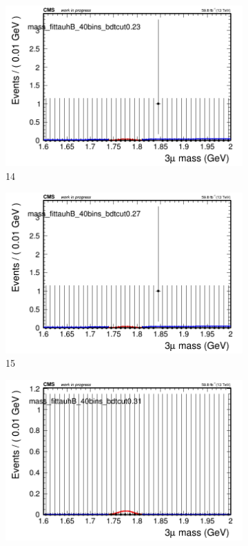 \begin{figure}[h!]
\begin{subfigure}{0.2\textwidth}
        \includegraphics[width=\textwidth]{power_law/plots/tauhB/massfit_tauhB_40bins_bdtcut0.23.png}
        \caption{14}
    \end{subfigure}
    \begin{subfigure}{0.2\textwidth}
        \includegraphics[width=\textwidth]{power_law/plots/tauhB/massfit_tauhB_40bins_bdtcut0.27.png}
        \caption{15}
    \end{subfigure}
    \begin{subfigure}{0.2\textwidth}
        \includegraphics[width=\textwidth]{power_law/plots/tauhB/massfit_tauhB_40bins_bdtcut0.31.png}

\end{subfigure}
\end{figure}
